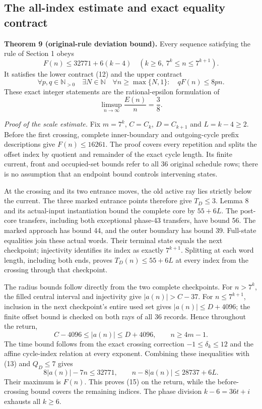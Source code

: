 \documentclass[11pt,a4paper]{article}
\begin{document}
\subsection*{The all-index estimate and exact equality contract}
\noindent\textbf{Theorem 9 (original-rule deviation bound).}
Every sequence satisfying the rule of Section 1 obeys
\begin{equation*}
F(n)\le32771+6(k-4)
\quad(k\ge6,\ 7^k\le n\le7^{k+1}). \tag{15}\label{eq:uppergoal}
\end{equation*}
It satisfies the lower contract (12) and the upper contract
\begin{equation*}
\forall p,q\in\mathbb N_{>0}\quad\exists N\in\mathbb N\quad
\forall n\ge\max\{N,1\}:\quad qF(n)\le8pn. \tag{16}\label{eq:uppercontract}
\end{equation*}
These exact integer statements are the rational-epsilon formulation of
\begin{equation*}
\limsup_{n\to\infty}\frac{E(n)}n=\frac38. \tag{17}\label{eq:equality}
\end{equation*}

\emph{Proof of the scale estimate.} Fix $m=7^k$, $C=C_k$, $D=C_{k+1}$
and $L=k-4\ge2$. Before the first crossing, complete inner-boundary and
outgoing-cycle prefix descriptions give $F(n)\le16261$. The proof covers
every repetition and splits the offset index by quotient and remainder
of the exact cycle length. Its finite current, front and occupied-set
bounds refer to all 36 original schedule rows; there is no assumption
that an endpoint bound controls intervening states.

At the crossing and its two entrance moves, the old active ray lies
strictly below the current. The three marked entrance points therefore
give $T_D\le3$. Lemma 8 and its actual-input instantiation bound the
complete core by $55+6L$. The post-core transfers, including both
exceptional phase-43 transfers, have bound 56. The marked approach has
bound 44, and the outer boundary has bound 39. Full-state equalities
join these actual words. Their terminal state equals the next checkpoint;
injectivity identifies its index as exactly $7^{k+1}$. Splitting at each
word length, including both ends, proves
$T_D(n)\le55+6L$ at every index from the crossing through that checkpoint.

The radius bounds follow directly from the two complete checkpoints.
For $n>7^k$, the filled central interval and injectivity give
$|a(n)|>C-37$. For $n\le7^{k+1}$, inclusion in the next checkpoint's
entire used set gives $|a(n)|\le D+4096$; the finite offset bound is
checked on both rays of all 36 records. Hence throughout the return,
\[
C-4096\le|a(n)|\le D+4096,\qquad n\ge4m-1.
\]
The time bound follows from the exact crossing correction
$-1\le\delta_k\le12$ and the affine cycle-index relation at every exponent.
Combining these inequalities with (13) and $Q_D\le7$ gives
\[
8|a(n)|-7n\le32771,\qquad
n-8|a(n)|\le28737+6L.
\]
Their maximum is $F(n)$. This proves (15) on the return, while the
before-crossing bound covers the remaining indices. The phase division
$k-6=36t+i$ exhausts all $k\ge6$.
\end{document}
